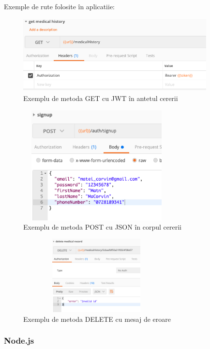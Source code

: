\documentclass[12pt]{article}
\begin{document}
\bigskip

Exemple de rute folosite în aplicatiie:

\begin{figure}[H]
\centering
\includegraphics[width=10cm, height=4cm]{get.png}
\caption{Exemplu de metoda GET cu JWT în antetul cererii}
\end{figure}


\begin{figure}[H]
\centering
\includegraphics[width=8cm, height=6cm]{post.png}
\caption{Exemplu de metoda POST cu JSON în corpul cererii}
\end{figure}
    
\begin{figure}[H]
\centering
\includegraphics[width=8cm, height=4cm]{delete.png}
\caption{Exemplu de metoda DELETE cu mesaj de eroare}
\end{figure}
    
\subsubsection{Node.js}
\end{document}
